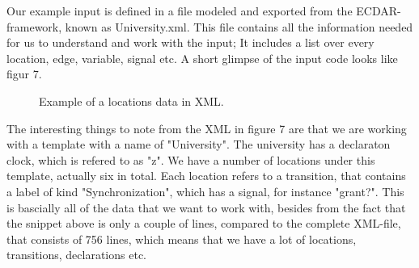 \newline
Our example input is defined in a file modeled and exported from the ECDAR-framework, known as University.xml. This file contains all the information needed for us to understand and work with the input; It includes a list over every location, edge, variable, signal etc. A short glimpse of the input code looks like figur 7.

\begin{figure}[t]


\caption{Example of a locations data in XML. \label{location-xml-example}}
\end{figure}

The interesting things to note from the XML in figure 7 are that we are working with a template with a name of "University". The university has a declaraton clock, which is refered to as "z". We have a number of locations under this template, actually six in total. Each location refers to a transition, that contains a label of kind "Synchronization", which has a signal, for instance "grant?". This is bascially all of the data that we want to work with, besides from the fact that the snippet above is only a couple of lines, compared to the complete XML-file, that consists of 756 lines, which means that we have a lot of locations, transitions, declarations etc.
